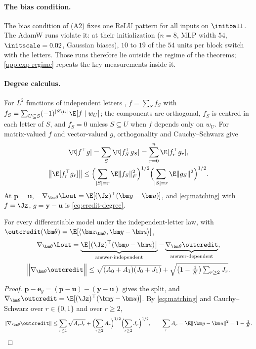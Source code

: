 \paragraph{The bias condition.}\label{rem:two-block-bias} The bias condition of (A2) fixes one ReLU pattern for all inputs on $\initball$. The AdamW runs violate it: at their initialization
($n=8$, MLP width $54$, $\initscale=0.02$, Gaussian biases), $10$ to $19$ of the $54$ units per block switch with the letters. Those
runs therefore lie outside the regime of the theorems; \cref{app:exp-regime} repeats the key measurements inside it.


\paragraph{Degree calculus.} For $L^2$ functions of independent letters \citep{hoeffding1948class,efron1981jackknife,odonnell2014analysis},
$f=\sum_Sf_S$ with $f_S=\sum_{U\subseteq S}(-1)^{|S\setminus U|}\E[f\mid w_U]$; the components are orthogonal, $f_S$ is centred in each letter of
$S$, and $f_S=0$ unless $S\subseteq U$ when $f$ depends only on $w_U$. For matrix-valued $f$ and vector-valued $g$, orthogonality and
Cauchy--Schwarz give
\begin{gather}
 \E[f^\top g]=\sum_S\E[f_S^\top g_S]=\sum_{r=0}^n\E[f_r^\top g_r],
 \nonumber\\
 \bigl\|\E[f_r^\top g_r]\bigr\|\le\Bigl(\sum_{|S|=r}\E\|f_S\|_F^2\Bigr)^{1/2}\Bigl(\sum_{|S|=r}\E\|g_S\|^2\Bigr)^{1/2}.
 \label{eq:matching}
\end{gather}
At $\bm p=\bm u$, $-\nabla_{\bm\theta}\Lout=\E[(\Jz)^\top(\bm y-\bm u)]$, and \cref{eq:matching} with $f=\Jz$, $g=\bm y-\bm u$ is \cref{eq:credit-degree}.

\begin{lemma}
\label{lem:gradient-split}
For every differentiable model under the independent-letter law, with $\outcredit(\bm\theta)=\E[\langle\bm z_{\bm\theta},\bm y-\bm u\rangle]$,
\begin{gather*}
 \nabla_{\bm\theta}\Lout=\underbrace{\E\bigl[(\Jz)^\top(\bm p-\bm u)\bigr]}_{\text{answer-independent}}-\underbrace{\nabla_{\bm\theta}\outcredit}_{\text{answer-dependent}},\\
 \Bigl\|\nabla_{\bm\theta}\outcredit\Bigr\|\le\sqrt{(A_0+A_1)(J_0+J_1)}+\sqrt{\bigl(1-\tfrac{1}{K}\bigr)\textstyle\sum_{r\ge2}J_r}.
\end{gather*}
\end{lemma}

\begin{proof}
$\bm p-\bm e_y=(\bm p-\bm u)-(\bm y-\bm u)$ gives the split, and $\nabla_{\bm\theta}\outcredit=\E[(\Jz)^\top(\bm y-\bm u)]$. By \cref{eq:matching} and Cauchy--Schwarz over
$r\in\{0,1\}$ and over $r\ge2$,
\[
 \|\nabla_{\bm\theta}\outcredit\|\le\sum_{r\le1}\sqrt{A_rJ_r}+\Bigl(\sum_{r\ge2}A_r\Bigr)^{1/2}\Bigl(\sum_{r\ge2}J_r\Bigr)^{1/2},\qquad \sum_rA_r=\E\|\bm y-\bm u\|^2=1-\tfrac{1}{K} .
\qedhere
\]
\end{proof}

